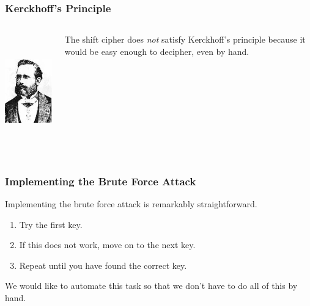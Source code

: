\documentclass{beamer}
\newcommand{\<}{\langle}
\renewcommand{\>}{\rangle}
\begin{document}
\begin{frame}
\frametitle{Kerckhoff's Principle}

\begin{columns}
\centering
\includegraphics[height=5cm, width=3.5cm]{IMG/kerckhoffs.jpg}

The shift cipher does \emph{not} satisfy Kerckhoff's principle because it would be easy enough to decipher, even by hand.
\end{columns} 
\end{frame}

\begin{frame}
\frametitle{Implementing the Brute Force Attack}

Implementing the brute force attack is remarkably straightforward. 
\begin{enumerate}
\item Try the first key.
\item If this does not work, move on to the next key.
\item Repeat until you have found the correct key.
\end{enumerate}

We would like to automate this task so that we don't have to do all of this by hand.
\end{frame}
\end{document}
